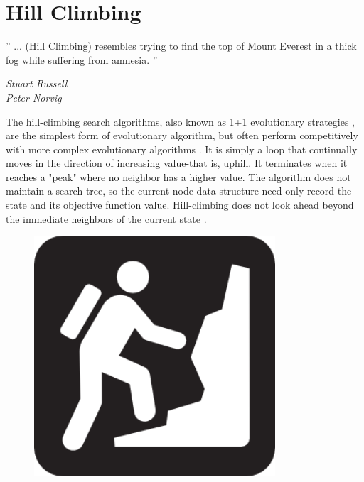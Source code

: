 \documentclass{mini}
\begin{document}
\chapter{Hill Climbing}\label{chap:hill_climbing}

\epigraph{'' ... (Hill Climbing) resembles trying to find the top of Mount Everest in a thick fog while suffering from amnesia. ''}{\textit{Stuart Russell \\ Peter Norvig }}

\bigskip

The hill-climbing search algorithms, also known as 1+1 evolutionary strategies \cite{hc_1}, are the simplest form of evolutionary algorithm, but often perform competitively with more complex evolutionary algorithms \cite{hc_2}. It is simply a loop that continually moves in the direction of increasing value-that is, uphill. It terminates when it reaches a "peak" where no neighbor has a higher value. The algorithm does not maintain a search tree, so the current node data structure need only record the state and its objective function value. Hill-climbing does not look ahead beyond the immediate neighbors of the current state \cite{hc_3}.

\begin{figure}
    \begin{center}
        \includegraphics[width=0.8\textwidth]{./images/hc_1.png}
    \end{center}
\end{figure}
\end{document}
